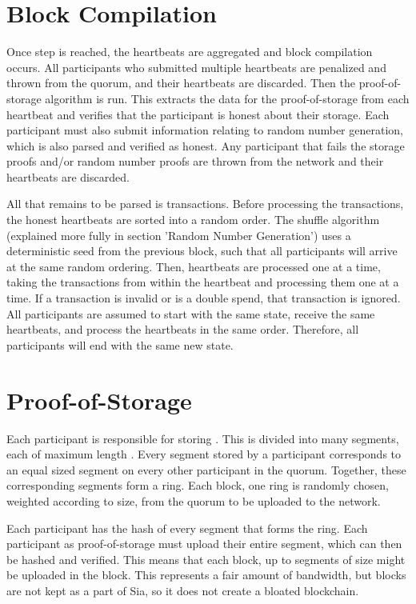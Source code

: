 \documentclass[twocolumn]{article}
\begin{document}
\section{Block Compilation}
Once step \quorumsize{} is reached, the heartbeats are aggregated and block compilation occurs.
All participants who submitted multiple heartbeats are penalized and thrown from the quorum, and their heartbeats are discarded.
Then the proof-of-storage algorithm is run.
This extracts the data for the proof-of-storage from each heartbeat and verifies that the participant is honest about their storage.
Each participant must also submit information relating to random number generation, which is also parsed and verified as honest.
Any participant that fails the storage proofs and/or random number proofs are thrown from the network and their heartbeats are discarded.

All that remains to be parsed is transactions.
Before processing the transactions, the honest heartbeats are sorted into a random order.
The shuffle algorithm (explained more fully in section 'Random Number Generation') uses a deterministic seed from the previous block, such that all participants will arrive at the same random ordering.
Then, heartbeats are processed one at a time, taking the transactions from within the heartbeat and processing them one at a time.
If a transaction is invalid or is a double spend, that transaction is ignored.
All participants are assumed to start with the same state, receive the same heartbeats, and process the heartbeats in the same order.
Therefore, all participants will end with the same new state.

\section{Proof-of-Storage}
Each participant is responsible for storing \participantvolume{}.
This \participantvolume{} is divided into many segments, each of maximum length \maxsegmentsize{}.
Every segment stored by a participant corresponds to an equal sized segment on every other participant in the quorum.
Together, these corresponding segments form a ring.
Each block, one ring is randomly chosen, weighted according to size, from the quorum to be uploaded to the network.

Each participant has the hash of every segment that forms the ring.
Each participant as proof-of-storage must upload their entire segment, which can then be hashed and verified.
This means that each block, up to \quorumsize{} segments of size \maxsegmentsize{} might be uploaded in the block.
This represents a fair amount of bandwidth, but blocks are not kept as a part of Sia, so it does not create a bloated blockchain.
\end{document}
